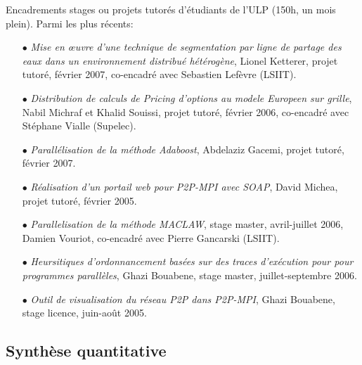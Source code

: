 \documentclass[11pt]{article}
\begin{document}
\label{sc:encadre-autres} 
Encadrements stages ou projets tutorés d'étudiants de l'ULP (150h, un mois plein). 
Parmi les plus récents:
\smallskip
\begin{itemize}
\item[$\bullet$]  {\it Mise en {\oe}uvre d'une technique de segmentation par ligne de partage des eaux dans un environnement distribué hétérogène}, Lionel Ketterer, projet tutoré, février 2007, co-encadré avec Sebastien Lefèvre (LSIIT).
\item[$\bullet$]  {\it Distribution de calculs de Pricing d'options au modele Europeen sur grille}, Nabil Michraf et Khalid Souissi, projet tutoré, février 2006, co-encadré avec Stéphane Vialle (Supelec).

\item[$\bullet$]  {\it Parallélisation de la méthode Adaboost}, Abdelaziz Gacemi, projet tutoré, février 2007.
\item[$\bullet$] {\it Réalisation d'un portail web pour P2P-MPI avec SOAP}, David Michea, projet tutoré, février 2005.

\item[$\bullet$] {\it Parallelisation de la méthode MACLAW}, stage master, avril-juillet 2006, Damien Vouriot, co-encadré avec Pierre Gancarski (LSIIT).
\item[$\bullet$] {\it Heursitiques d'ordonnancement basées sur des traces d'exécution pour pour programmes parallèles}, Ghazi Bouabene, stage master, juillet-septembre 2006.
\item[$\bullet$]  {\it Outil de visualisation du réseau P2P dans P2P-MPI}, Ghazi Bouabene, stage licence, juin-août 2005.
\end{itemize}





\subsection{Synthèse quantitative}
\end{document}
